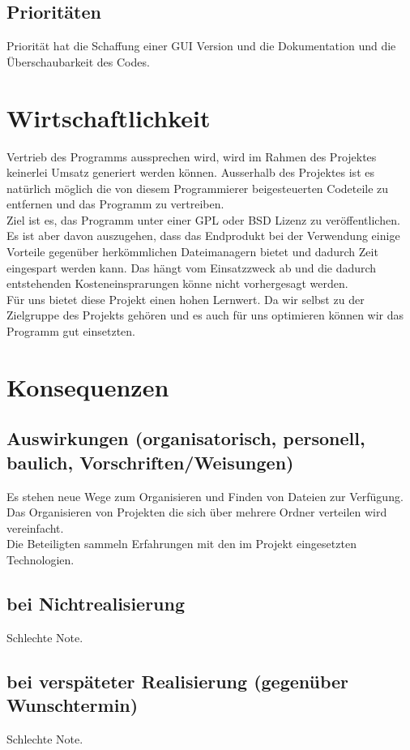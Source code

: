 \documentclass[10pt,paper=a4,final]{scrartcl}
\begin{document}
\subsection{Prioritäten}
Priorität hat die Schaffung einer GUI Version und die Dokumentation und die Überschaubarkeit des Codes.

\section{Wirtschaftlichkeit}
Vertrieb des Programms aussprechen wird, wird im Rahmen des Projektes keinerlei Umsatz generiert werden können. Ausserhalb des Projektes ist es natürlich möglich die von diesem Programmierer beigesteuerten Codeteile zu entfernen und das Programm zu vertreiben.\\
Ziel ist es, das Programm unter einer GPL oder BSD Lizenz zu veröffentlichen.\\
Es ist aber davon auszugehen, dass das Endprodukt bei der Verwendung einige Vorteile gegenüber herkömmlichen Dateimanagern bietet und dadurch Zeit eingespart werden kann. Das hängt vom Einsatzzweck ab und die dadurch entstehenden Kosteneinsprarungen könne nicht vorhergesagt werden.\\
Für uns bietet diese Projekt einen hohen Lernwert. Da wir selbst zu der Zielgruppe des Projekts gehören und es auch für uns optimieren können wir das Programm gut einsetzten.

\section{Konsequenzen}
\subsection{Auswirkungen (organisatorisch, personell, baulich, Vorschriften/Weisungen)}
Es stehen neue Wege zum Organisieren und Finden von Dateien zur Verfügung.\\
Das Organisieren von Projekten die sich über mehrere Ordner verteilen wird vereinfacht.\\
Die Beteiligten sammeln Erfahrungen mit den im Projekt eingesetzten Technologien.
\subsection{bei Nichtrealisierung}
Schlechte Note.
\subsection{bei verspäteter Realisierung (gegenüber Wunschtermin)}
Schlechte Note.
\end{document}
